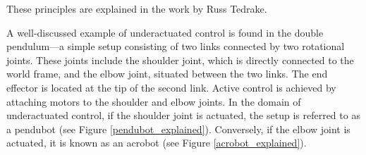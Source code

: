 These principles are explained in the work by Russ Tedrake\cite{tedrake2022underactuated}.

A well-discussed example of underactuated control is found in the double pendulum—a simple setup consisting of two links connected by two rotational joints. These joints include the shoulder joint, which is directly connected to the world frame, and the elbow joint, situated between the two links. The end effector is located at the tip of the second link. Active control is achieved by attaching motors to the shoulder and elbow joints. In the domain of underactuated control, if the shoulder joint is actuated, the setup is referred to as a pendubot (see Figure \ref{pendubot_explained}). Conversely, if the elbow joint is actuated, it is known as an acrobot (see Figure \ref{acrobot_explained}).

